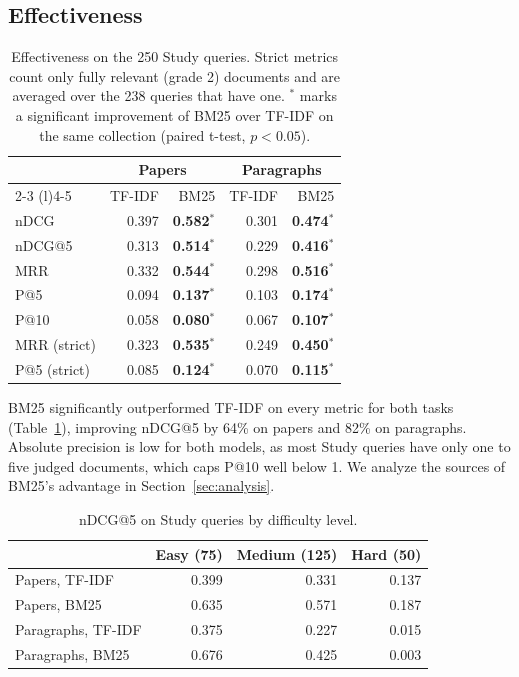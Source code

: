 \documentclass[sigconf,nonacm]{acmart}
\begin{document}
\subsection{Effectiveness}
\label{sec:effectiveness}
\begin{table}[t]
  \caption{Effectiveness on the 250 Study queries. Strict metrics count only fully
  relevant (grade 2) documents and are averaged over the 238 queries that have one.
  $^{*}$ marks a significant improvement of BM25 over TF-IDF on the same collection
  (paired t-test, $p < 0.05$).}
  \label{tab:main}
  \small
  \begin{tabular}{lrrrr}
    \toprule
    & \multicolumn{2}{c}{Papers} & \multicolumn{2}{c}{Paragraphs} \\
    \cmidrule(lr){2-3} \cmidrule(l){4-5}
    & TF-IDF & BM25 & TF-IDF & BM25 \\
    \midrule
    nDCG           & 0.397 & \textbf{0.582}$^{*}$ & 0.301 & \textbf{0.474}$^{*}$ \\
    nDCG@5         & 0.313 & \textbf{0.514}$^{*}$ & 0.229 & \textbf{0.416}$^{*}$ \\
    MRR            & 0.332 & \textbf{0.544}$^{*}$ & 0.298 & \textbf{0.516}$^{*}$ \\
    P@5            & 0.094 & \textbf{0.137}$^{*}$ & 0.103 & \textbf{0.174}$^{*}$ \\
    P@10           & 0.058 & \textbf{0.080}$^{*}$ & 0.067 & \textbf{0.107}$^{*}$ \\
    \midrule
    MRR (strict)   & 0.323 & \textbf{0.535}$^{*}$ & 0.249 & \textbf{0.450}$^{*}$ \\
    P@5 (strict)   & 0.085 & \textbf{0.124}$^{*}$ & 0.070 & \textbf{0.115}$^{*}$ \\
    \bottomrule
  \end{tabular}
\end{table}

BM25 significantly outperformed TF-IDF on every metric for both tasks (Table~\ref{tab:main}),
improving nDCG@5 by 64\% on papers and 82\% on paragraphs. Absolute precision is low for
both models, as most Study queries have only one to five judged documents, which caps P@10 
well below 1. We analyze the sources of BM25's advantage in Section~\ref{sec:analysis}.

\begin{table}[t]
  \caption{nDCG@5 on Study queries by difficulty level.}
  \label{tab:difficulty}
  \small
  \begin{tabular}{lrrr}
    \toprule
    & Easy (75) & Medium (125) & Hard (50) \\
    \midrule
    Papers, TF-IDF     & 0.399 & 0.331 & 0.137 \\
    Papers, BM25       & 0.635 & 0.571 & 0.187 \\
    Paragraphs, TF-IDF & 0.375 & 0.227 & 0.015 \\
    Paragraphs, BM25   & 0.676 & 0.425 & 0.003 \\
    \bottomrule
  \end{tabular}
\end{table}
\end{document}
